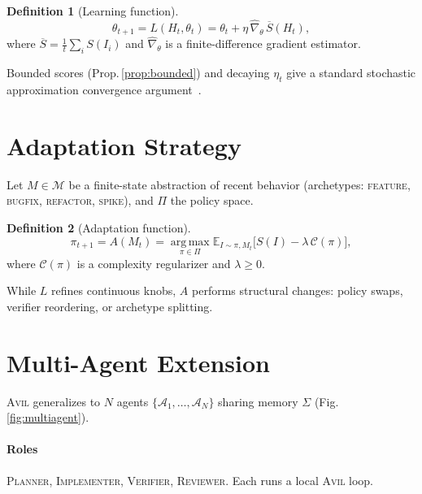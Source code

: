 \documentclass[10pt,twocolumn,letterpaper]{article}
\theoremstyle{definition}
\newtheorem{definition}{Definition}[section]
\theoremstyle{plain}
\newcommand{\AVIL}{\textsc{Avil}}
\newcommand{\Model}{\mathcal{M}}
\newcommand{\Policy}{\Pi}
\begin{document}
\begin{definition}[Learning function]\label{def:learning}
\begin{equation}\label{eq:learning}
\theta_{t+1}=L(H_t,\theta_t)
  =\theta_t+\eta\,\widehat{\nabla}_\theta\,\overline{S}(H_t),
\end{equation}
where $\overline{S}=\frac{1}{t}\sum_i S(I_i)$ and
$\widehat{\nabla}_\theta$ is a finite-difference gradient estimator.
\end{definition}

Bounded scores (Prop.\,\ref{prop:bounded}) and decaying $\eta_t$ give
a standard stochastic approximation convergence
argument~\citep{sutton2018rl}.

\section{Adaptation Strategy}\label{sec:adaptation}

Let $M\in\Model$ be a finite-state abstraction of recent behavior
(archetypes: \textsc{feature}, \textsc{bugfix}, \textsc{refactor},
\textsc{spike}), and $\Policy$ the policy space.

\begin{definition}[Adaptation function]\label{def:adaptation}
\begin{equation}\label{eq:adaptation}
\pi_{t+1}=A(M_t)
  =\operatorname*{arg\,max}_{\pi\in\Policy}
  \mathbb{E}_{I\sim\pi,M_t}
  \bigl[S(I)-\lambda\,\mathcal{C}(\pi)\bigr],
\end{equation}
where $\mathcal{C}(\pi)$ is a complexity regularizer and
$\lambda\geq0$.
\end{definition}

While $L$ refines continuous knobs, $A$ performs structural changes:
policy swaps, verifier reordering, or archetype splitting.

\section{Multi-Agent Extension}\label{sec:multi-agent}

\AVIL{} generalizes to $N$ agents
$\{\mathcal{A}_1,\dots,\mathcal{A}_N\}$ sharing memory $\Sigma$
(Fig.\,\ref{fig:multiagent}).

\paragraph{Roles}
\textsc{Planner}, \textsc{Implementer}, \textsc{Verifier},
\textsc{Reviewer}. Each runs a local \AVIL{} loop.
\end{document}
